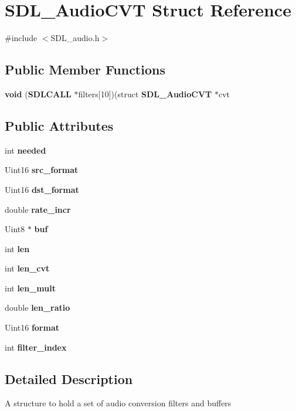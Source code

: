 \section{S\+D\+L\+\_\+\+Audio\+C\+V\+T Struct Reference}
\label{struct_s_d_l___audio_c_v_t}


{\ttfamily \#include $<$S\+D\+L\+\_\+audio.\+h$>$}

\subsection*{Public Member Functions}
\begin{DoxyCompactItemize}
\item 
{\bfseries void} ({\bf S\+D\+L\+C\+A\+L\+L} $\ast$filters[10])(struct {\bf S\+D\+L\+\_\+\+Audio\+C\+V\+T} $\ast$cvt\label{struct_s_d_l___audio_c_v_t_a289a571421d05e416dd585c6f890a75b}

\end{DoxyCompactItemize}
\subsection*{Public Attributes}
\begin{DoxyCompactItemize}
\item 
int {\bf needed}
\item 
Uint16 {\bf src\+\_\+format}
\item 
Uint16 {\bf dst\+\_\+format}
\item 
double {\bf rate\+\_\+incr}
\item 
Uint8 $\ast$ {\bf buf}
\item 
int {\bf len}
\item 
int {\bf len\+\_\+cvt}
\item 
int {\bf len\+\_\+mult}
\item 
double {\bf len\+\_\+ratio}
\item 
Uint16 {\bfseries format}\label{struct_s_d_l___audio_c_v_t_a020b6e1c01089169921ddb0c1e7f08d2}

\item 
int {\bf filter\+\_\+index}
\end{DoxyCompactItemize}


\subsection{Detailed Description}
A structure to hold a set of audio conversion filters and buffers 

